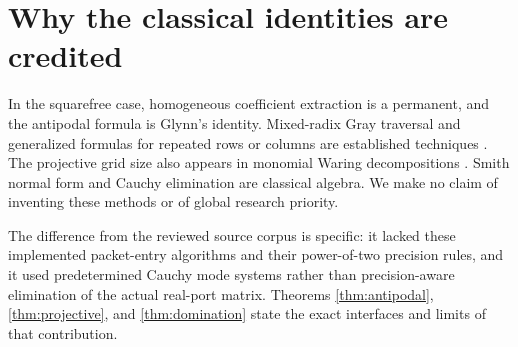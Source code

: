 \documentclass[11pt,letterpaper]{article}
\theoremstyle{definition}\newtheorem{definition}[theorem]{Definition}
\theoremstyle{remark}\newtheorem{remark}[theorem]{Remark}
\begin{document}
\appendix
\section{Why the classical identities are credited}
In the squarefree case, homogeneous coefficient extraction is a permanent,
and the antipodal formula is Glynn's identity. Mixed-radix Gray traversal
and generalized formulas for repeated rows or columns are established
techniques \cite{glynn,chin}. The projective grid size also appears in
monomial Waring decompositions \cite{ccg}. Smith normal form and Cauchy
elimination are classical algebra. We make no claim of inventing these
methods or of global research priority.

The difference from the reviewed source corpus is specific: it lacked
these implemented packet-entry algorithms and their power-of-two precision
rules, and it used predetermined Cauchy mode systems rather than
precision-aware elimination of the actual real-port matrix. Theorems
\ref{thm:antipodal}, \ref{thm:projective}, and \ref{thm:domination} state
the exact interfaces and limits of that contribution.
\end{document}
